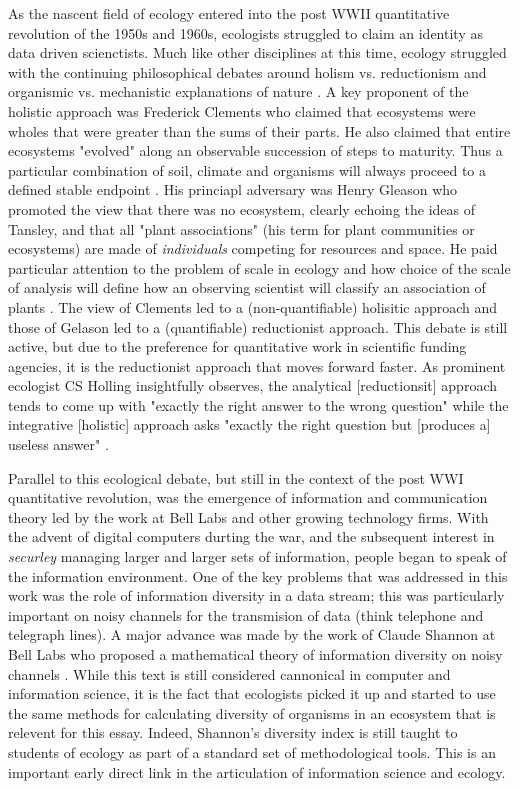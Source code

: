 As the nascent field of ecology entered into the post WWII quantitative revolution of the 1950s and 1960s, ecologists struggled to claim an identity as data driven scienctists. Much like other disciplines at this time, ecology struggled with the continuing philosophical debates around holism vs. reductionism and organismic vs. mechanistic explanations of nature \cite{barbour_1996}. A key proponent of the holistic approach was Frederick Clements who claimed that ecosystems were wholes that were greater than the sums of their parts. He also claimed that entire ecosystems "evolved" along an observable succession of steps to maturity. Thus a particular combination of soil, climate and organisms will always proceed to a defined stable endpoint \cite{clements_1936}. His princiapl adversary was Henry Gleason who promoted the view that there was no ecosystem, clearly echoing the ideas of Tansley, and that all "plant associations" (his term for plant communities or ecosystems) are made of \textit{individuals} competing for resources and space. He paid particular attention to the problem of scale in ecology and how choice of the scale of analysis will define how an observing scientist will classify an association of plants \cite{gleason_1939}. The view of Clements led to a (non-quantifiable) holisitic approach and those of Gelason led to a (quantifiable) reductionist approach. This debate is still active, but due to the preference for quantitative work in scientific funding agencies, it is the reductionist approach that moves forward faster. As prominent ecologist CS Holling insightfully observes, the analytical [reductionsit] approach tends to come up with "exactly the right answer to the wrong question" while the integrative [holistic] approach asks "exactly the right question but [produces a] useless answer" \cite[][p. 3]{holling_1998}.

Parallel to this ecological debate, but still in the context of the post WWI quantitative revolution, was the emergence of information and communication theory led by the work at Bell Labs and other growing technology firms. With the advent of digital computers durting the war, and the subsequent interest in \textit{securley} managing larger and larger sets of information, people began to speak of the information environment. One of the key problems that was addressed in this work was the role of information diversity in a data stream; this was particularly important on noisy channels for the transmision of data (think telephone and telegraph lines). A major advance was made by the work of Claude Shannon at Bell Labs who proposed a mathematical theory of information diversity on noisy channels \cite{shannon_1948}. While this text is still considered cannonical in computer and information science, it is the fact that ecologists picked it up and started to use the same methods for calculating diversity of organisms in an ecosystem that is relevent for this essay. Indeed, Shannon's diversity index is still taught to students of ecology as part of a standard set of methodological tools. This is an important early direct link in the articulation of information science and ecology.

